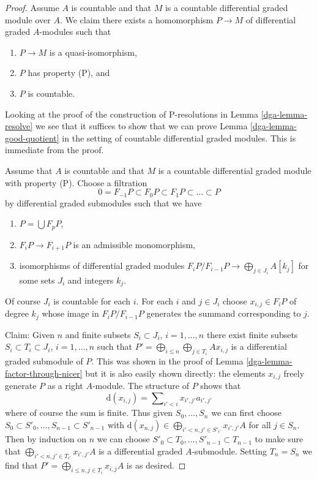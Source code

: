 \begin{proof}
\medskip\noindent
Assume $A$ is countable and that $M$ is a countable differential graded
module over $A$. We claim there exists a homomorphism
$P \to M$ of differential graded $A$-modules such that
\begin{enumerate}
\item $P \to M$ is a quasi-isomorphism,
\item $P$ has property (P), and
\item $P$ is countable.
\end{enumerate}
Looking at the proof of the construction of P-resolutions in
Lemma \ref{dga-lemma-resolve} we see that it suffices to show that
we can prove Lemma \ref{dga-lemma-good-quotient}
in the setting of countable differential graded modules.
This is immediate from the proof.

\medskip\noindent
Assume that $A$ is countable and that $M$ is a countable
differential graded module with property (P). Choose a filtration
$$
0 = F_{-1}P \subset F_0P \subset F_1P \subset \ldots \subset P
$$
by differential graded submodules such that we have
\begin{enumerate}
\item $P = \bigcup F_pP$,
\item $F_iP \to F_{i + 1}P$ is an admissible monomorphism,
\item isomorphisms of differential graded modules
$F_iP/F_{i - 1}P \to \bigoplus_{j \in J_i} A[k_j]$
for some sets $J_i$ and integers $k_j$.
\end{enumerate}
Of course $J_i$ is countable for each $i$. For each $i$ and
$j \in J_i$ choose $x_{i, j} \in F_iP$ of degree $k_j$ whose
image in $F_iP/F_{i - 1}P$ generates the summand corresponding
to $j$.

\medskip\noindent
Claim: Given $n$ and finite subsets $S_i \subset J_i$, $i = 1, \ldots, n$
there exist finite subsets $S_i \subset T_i \subset J_i$, $i = 1, \ldots, n$
such that $P' = \bigoplus_{i \leq n} \bigoplus_{j \in T_i} Ax_{i, j}$
is a differential graded submodule of $P$. This was shown in the
proof of Lemma \ref{dga-lemma-factor-through-nicer} but it is also
easily shown directly: the elements $x_{i, j}$ freely generate
$P$ as a right $A$-module. The structure of $P$ shows that
$$
\text{d}(x_{i, j}) = \sum\nolimits_{i' < i} x_{i', j'}a_{i', j'}
$$
where of course the sum is finite.
Thus given $S_0, \ldots, S_n$ we can first choose
$S_0 \subset S'_0, \ldots, S_{n - 1} \subset S'_{n - 1}$ with
$\text{d}(x_{n, j}) \in \bigoplus_{i' < n, j' \in S'_{i'}} x_{i', j'}A$
for all $j \in S_n$. Then by induction on $n$ we can choose
$S'_0 \subset T_0, \ldots, S'_{n - 1} \subset T_{n - 1}$
to make sure that $\bigoplus_{i' < n, j' \in T_{i'}} x_{i', j'}A$
is a differential graded $A$-submodule. Setting $T_n = S_n$ we find that
$P' = \bigoplus_{i \leq n, j \in T_i} x_{i, j}A$ is as desired.


\end{proof}
